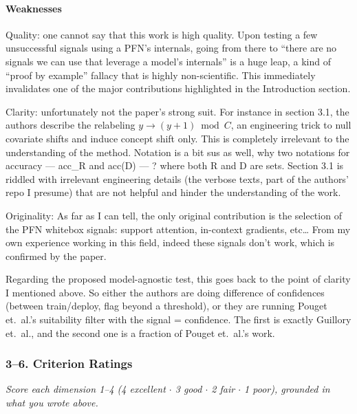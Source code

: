 \paragraph{Weaknesses}

Quality: one cannot say that this work is high quality. Upon testing a few
unsuccessful signals using a PFN's internals, going from there to ``there are
no signals we can use that leverage a model's internals'' is a huge leap, a
kind of ``proof by example'' fallacy that is highly non-scientific. This
immediately invalidates one of the major contributions highlighted in the
Introduction section.

Clarity: unfortunately not the paper's strong suit. For instance in section
3.1, the authors describe the relabeling $y \rightarrow (y+1) \bmod C$, an
engineering trick to null covariate shifts and induce concept shift only. This
is completely irrelevant to the understanding of the method. Notation is a bit
sus as well, why two notations for accuracy --- acc\_R and acc(D) --- ? where
both R and D are sets. Section 3.1 is riddled with irrelevant engineering
details (the verbose texts, part of the authors' repo I presume) that are not
helpful and hinder the understanding of the work.

Originality: As far as I can tell, the only original contribution is the
selection of the PFN whitebox signals: support attention, in-context gradients,
etc\ldots{} From my own experience working in this field, indeed these signals
don't work, which is confirmed by the paper.

Regarding the proposed model-agnostic test, this goes back to the point of
clarity I mentioned above. So either the authors are doing difference of
confidences (between train/deploy, flag beyond a threshold), or they are
running Pouget et.\ al.'s suitability filter with the signal = confidence. The
first is exactly Guillory et.\ al., and the second one is a fraction of Pouget
et.\ al.'s work.

\subsubsection*{3--6. Criterion Ratings}
{\itshape Score each dimension 1--4 (4 excellent \(\cdot\) 3 good \(\cdot\) 2
fair \(\cdot\) 1 poor), grounded in what you wrote above.}

